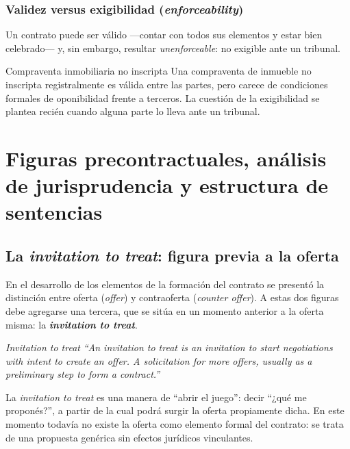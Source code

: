 \documentclass[12pt,oneside]{book}
\begin{document}
\subsection{Validez versus exigibilidad (\textit{enforceability})}

Un contrato puede ser válido ---contar con todos sus elementos y estar bien celebrado--- y, sin embargo, resultar \textit{unenforceable}: no exigible ante un tribunal.

\begin{example}{Compraventa inmobiliaria no inscripta}
Una compraventa de inmueble no inscripta registralmente es válida entre las partes, pero carece de condiciones formales de oponibilidad frente a terceros. La cuestión de la exigibilidad se plantea recién cuando alguna parte lo lleva ante un tribunal.
\end{example}

\chapter{Figuras precontractuales, análisis de jurisprudencia y estructura de sentencias}
\label{cap:jurisprudencia}

\section{La \textit{invitation to treat}: figura previa a la oferta}
\label{sec:invitation}

En el desarrollo de los elementos de la formación del contrato se presentó la distinción entre oferta (\textit{offer}) y contraoferta (\textit{counter offer}). A estas dos figuras debe agregarse una tercera, que se sitúa en un momento anterior a la oferta misma: la \textbf{\textit{invitation to treat}}.

\begin{definition}{\textit{Invitation to treat}}
\textit{``An invitation to treat is an invitation to start negotiations with intent to create an offer. A solicitation for more offers, usually as a preliminary step to form a contract.''}

La \textit{invitation to treat} es una manera de ``abrir el juego'': decir ``¿qué me proponés?'', a partir de la cual podrá surgir la oferta propiamente dicha. En este momento todavía no existe la oferta como elemento formal del contrato: se trata de una propuesta genérica sin efectos jurídicos vinculantes.
\end{definition}
\end{document}
